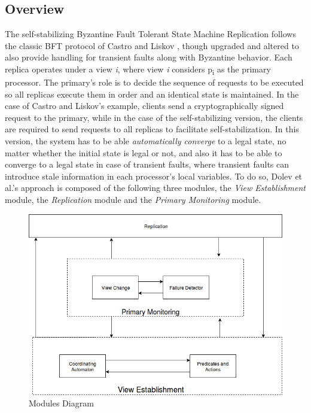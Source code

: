 \documentclass[12pt,a4paper]{report}
\begin{document}
			\subsection{Overview}
				The self-stabilizing Byzantine Fault Tolerant State Machine Replication\cite{ssbft} follows the classic BFT protocol of Castro and Liskov \cite{pbft}, though upgraded and altered to also provide handling for transient faults along with Byzantine behavior. Each replica operates under a view \textit{ i}, where view \textit{i} considers p\textsubscript{i} as the primary processor. The primary's role is to decide the sequence of requests to be executed so all replicas execute them in order and an identical state is maintained. In the case of Castro and Liskov's example, clients send a cryptographically signed request to the primary, while in the case of the self-stabilizing version, the clients are required to send requests to all replicas to facilitate self-stabilization. In this version, the system has to be able \textit{automatically converge}  to a legal state, no matter whether the initial state is legal or not, and also it has to be able to converge to a legal state in case of transient faults, where transient faults can introduce stale information in each processor's local variables. To do so, Dolev et al.'s approach is composed of the following three modules, the \textit{View Establishment} module, the \textit{Replication} module and the \textit{Primary Monitoring} module.
				\begin{figure} [h]
		            \caption{Modules Diagram}
			        \begin{center}
			        	\includegraphics[scale=0.5]{ade/ssbftdiagram.png}
			        \end{center}
	           \end{figure}
	           
\end{document}
